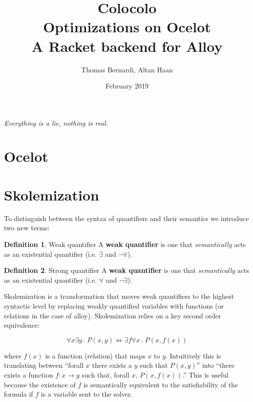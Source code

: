 \documentclass{article}
\title{Colocolo\\\large Optimizations on Ocelot \\ A Racket backend for Alloy}
\date{February 2019}
\author{Thomas Bernardi, Altan Haan}
\theoremstyle{definition}
\newtheorem{definition}{Definition}[section]
\begin{document}
	\maketitle
	\begin{center}	
		\textit{Everything is a lie, nothing is real.} \\
    \end{center}

    \section{Ocelot}

    \section{Skolemization}

    To distinguish between the syntax of quantifiers and their semantics we introduce two new terms:\\
    \theoremstyle{definition}
    \begin{definition}{Weak quantifier}
        A \textbf{weak quantifier} is one that \emph{semantically} acts as an existential quantifier (i.e. $\exists$ and $\neg \forall$).
    \end{definition}

    \begin{definition}{Strong quantifier}
        A \textbf{weak quantifier} is one that \emph{semantically} acts as an existential quantifier (i.e. $\forall$ and $\neg \exists$).
    \end{definition}

    Skolemization is a transformation that moves weak quantifiers to the highest syntactic level by replacing weakly quantified variables with functions (or relations in the case of alloy). Skolemization relies on a key second order equivalence:

    \begin{equation} \label{eqv1}
        \forall x \exists y~.~P(x, y) \Leftrightarrow \exists f \forall x~.~P(x, f(x))
    \end{equation}

    where $f(x)$ is a function (relation) that maps $x$ to $y$. Intuitively this is translating between ``forall $x$ there exists a $y$ such that $P(x, y)$'' into ``there exists a function $f : x \rightarrow y$ such that, forall $x$, $P(x, f(x))$.'' This is useful because the existence of $f$ is semantically equivalent to the satisfiability of the formula if $f$ is a variable sent to the solver.
\end{document}
